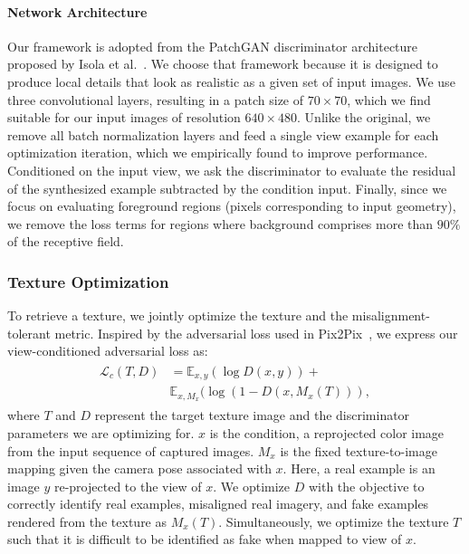 \paragraph{Network Architecture}
%
Our framework is adopted from the PatchGAN discriminator architecture proposed by Isola et al.~\cite{isola2017image}.  We choose that framework because it is designed to produce local details that look as realistic as a given set of input images.
%
We use three convolutional layers, resulting in a patch size of $70\times 70$, which we find suitable for our input images of resolution $640\times 480$.
%
Unlike the original, we remove all batch normalization layers and feed a single view example for each optimization iteration, which we empirically found to improve performance.
%
Conditioned on the input view, we ask the discriminator to evaluate the residual of the synthesized example subtracted by the condition input.
%
Finally, since we focus on evaluating foreground regions (pixels corresponding to input geometry), we remove the loss terms for regions where background comprises more than $90\%$ of the receptive field.
%

\subsubsection{Texture Optimization}%

%
To retrieve a texture, we jointly optimize the texture and the misalignment-tolerant metric.
%
Inspired by the adversarial loss used in Pix2Pix~\cite{isola2017image}, we express our view-conditioned adversarial loss as:
\begin{align}
\begin{split}
    \mathcal{L}_c(T,D) &= \mathbb{E}_{x,y}(\log D(x,y)) +\\ &\mathbb{E}_{x,M_x}(\log (1 - D(x, M_x(T) ) ),
\end{split}
\end{align}
where $T$ and $D$ represent the target texture image and the discriminator parameters we are optimizing for.
%
$x$ is the condition, a reprojected color image from the input sequence of captured images.
%
$M_x$ is the fixed texture-to-image mapping given the camera pose associated with $x$. 
%
Here, a real example is an image $y$ re-projected to the view of $x$.
%
We optimize $D$ with the objective to correctly identify real examples, misaligned real imagery, and fake examples rendered from the texture as $M_x(T)$. 
%
Simultaneously, we optimize the texture $T$ such that it is difficult to be identified as fake when mapped to view of $x$.
%

